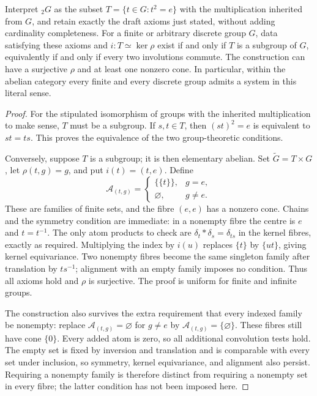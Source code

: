 \begin{theorem}\label{C-literal-class}
Interpret ${}_2G$ as the subset $T=\{t\in G:t^2=e\}$ with the multiplication
inherited from $G$, and retain exactly the draft axioms just stated,
without adding cardinality completeness. For a finite or arbitrary
discrete group $G$, data satisfying these axioms and
$i:T\simeq\ker\rho$ exist if and only if $T$ is a subgroup of $G$,
equivalently if and only if every two involutions commute. The construction
can have a surjective $\rho$ and at least one nonzero cone. In particular,
within the abelian category every finite and every discrete group admits
a system in this literal sense.
\end{theorem}
\begin{proof}
For the stipulated isomorphism of groups with the inherited multiplication
to make sense, $T$ must be a subgroup. If $s,t\in T$, then
$(st)^2=e$ is equivalent to $st=ts$. This proves the equivalence of the
two group-theoretic conditions.

Conversely, suppose $T$ is a subgroup; it is then elementary abelian.
Set $\widetilde G=T\times G$, let $\rho(t,g)=g$, and put
$i(t)=(t,e)$. Define
\[
 \mathcal A_{(t,g)}=
 \begin{cases}
 \{\{t\}\},&g=e,\\
 \varnothing,&g\ne e.
 \end{cases}
\]
These are families of finite sets, and the fibre $(e,e)$ has a nonzero
cone. Chains and the symmetry condition are immediate: in a nonempty
fibre the centre is $e$ and $t=t^{-1}$.
The only atom products to check are
$\delta_t*\delta_s=\delta_{ts}$ in the kernel fibres, exactly as required.
Multiplying the index by $i(u)$ replaces $\{t\}$ by $\{ut\}$, giving
kernel equivariance. Two nonempty fibres become the same singleton family
after translation by $ts^{-1}$; alignment with an empty family imposes no
condition. Thus all axioms hold and $\rho$ is surjective.
The proof is uniform for finite and infinite groups.

The construction also survives the extra requirement that every indexed
family be nonempty: replace $\mathcal A_{(t,g)}=\varnothing$ for $g\ne e$
by $\mathcal A_{(t,g)}=\{\varnothing\}$. These fibres still have cone
$\{0\}$. Every added atom is zero, so all additional convolution tests
hold. The empty set is fixed by inversion and translation and is
comparable with every set under inclusion, so symmetry, kernel
equivariance, and alignment also persist. Requiring a nonempty family
is therefore distinct from requiring a nonempty set in every fibre;
the latter condition has not been imposed here.
\end{proof}


